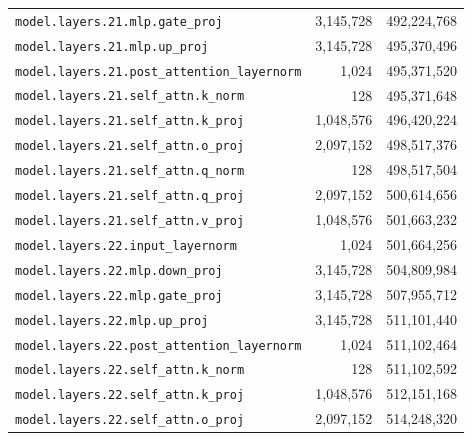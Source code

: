 \documentclass[10pt,a4paper]{article}
\theoremstyle{definition}
\begin{document}
\begin{appendices}
\begin{longtable}{p{9.5cm}rr}
\texttt{model.\allowbreak{}layers.\allowbreak{}21.\allowbreak{}mlp.\allowbreak{}gate\_proj} & 3,145,728 & 492,224,768 \\
\texttt{model.\allowbreak{}layers.\allowbreak{}21.\allowbreak{}mlp.\allowbreak{}up\_proj} & 3,145,728 & 495,370,496 \\
\texttt{model.\allowbreak{}layers.\allowbreak{}21.\allowbreak{}post\_attention\_layernorm} & 1,024 & 495,371,520 \\
\texttt{model.\allowbreak{}layers.\allowbreak{}21.\allowbreak{}self\_attn.\allowbreak{}k\_norm} & 128 & 495,371,648 \\
\texttt{model.\allowbreak{}layers.\allowbreak{}21.\allowbreak{}self\_attn.\allowbreak{}k\_proj} & 1,048,576 & 496,420,224 \\
\texttt{model.\allowbreak{}layers.\allowbreak{}21.\allowbreak{}self\_attn.\allowbreak{}o\_proj} & 2,097,152 & 498,517,376 \\
\texttt{model.\allowbreak{}layers.\allowbreak{}21.\allowbreak{}self\_attn.\allowbreak{}q\_norm} & 128 & 498,517,504 \\
\texttt{model.\allowbreak{}layers.\allowbreak{}21.\allowbreak{}self\_attn.\allowbreak{}q\_proj} & 2,097,152 & 500,614,656 \\
\texttt{model.\allowbreak{}layers.\allowbreak{}21.\allowbreak{}self\_attn.\allowbreak{}v\_proj} & 1,048,576 & 501,663,232 \\
\texttt{model.\allowbreak{}layers.\allowbreak{}22.\allowbreak{}input\_layernorm} & 1,024 & 501,664,256 \\
\texttt{model.\allowbreak{}layers.\allowbreak{}22.\allowbreak{}mlp.\allowbreak{}down\_proj} & 3,145,728 & 504,809,984 \\
\texttt{model.\allowbreak{}layers.\allowbreak{}22.\allowbreak{}mlp.\allowbreak{}gate\_proj} & 3,145,728 & 507,955,712 \\
\texttt{model.\allowbreak{}layers.\allowbreak{}22.\allowbreak{}mlp.\allowbreak{}up\_proj} & 3,145,728 & 511,101,440 \\
\texttt{model.\allowbreak{}layers.\allowbreak{}22.\allowbreak{}post\_attention\_layernorm} & 1,024 & 511,102,464 \\
\texttt{model.\allowbreak{}layers.\allowbreak{}22.\allowbreak{}self\_attn.\allowbreak{}k\_norm} & 128 & 511,102,592 \\
\texttt{model.\allowbreak{}layers.\allowbreak{}22.\allowbreak{}self\_attn.\allowbreak{}k\_proj} & 1,048,576 & 512,151,168 \\
\texttt{model.\allowbreak{}layers.\allowbreak{}22.\allowbreak{}self\_attn.\allowbreak{}o\_proj} & 2,097,152 & 514,248,320 \\

\end{longtable}
\end{appendices}
\end{document}
